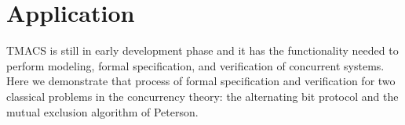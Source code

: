 \section{Application}
\label{sec:application}

TMACS is still in early development phase and it has the functionality needed to perform modeling, formal specification, and verification of concurrent systems. Here we demonstrate that process of formal specification and verification for two classical problems in the concurrency theory: the alternating bit protocol and the mutual exclusion algorithm of Peterson.


